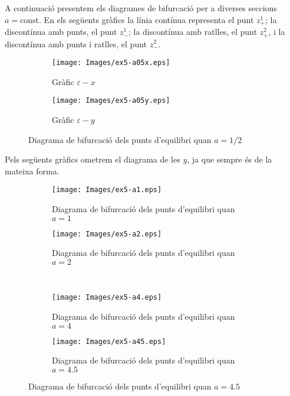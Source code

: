 \documentclass[a4paper]{article}
\theoremstyle{definition}
\begin{document}
A continuació presentem els diagrames de bifurcació per a diverses seccions $a=\mathrm{const}$. En els següents gràfics la línia contínua representa el punt $z_+^1$; la discontínua amb punts, el punt $z_-^1$; la discontínua amb ratlles, el punt $z_+^2$, i la discontínua amb punts i ratlles, el punt $z_-^2$.

\begin{figure}[!ht]
  \captionsetup[subfigure]{justification=centering}
  \centering
  \begin{subfigure}[b]{0.4\linewidth}
    \centering
    \texttt{[image: Images/ex5-a05x.eps]}
    \caption{Gràfic $\varepsilon - x$}
  \end{subfigure}
  \hfill
  \begin{subfigure}[b]{0.4\linewidth}
    \centering
    \texttt{[image: Images/ex5-a05y.eps]}
    \caption{Gràfic $\varepsilon - y$}
  \end{subfigure}
  \caption{Diagrama de bifurcació dels punts d'equilibri quan $a=1/2$}
\end{figure}
\newpage
Pels següents gràfics ometrem el diagrama de les $y$, ja que sempre és de la mateixa forma.

\begin{figure}[!ht]
  \captionsetup[subfigure]{justification=centering}
  \centering
  \begin{subfigure}[b]{0.49\linewidth}
    \centering
    \texttt{[image: Images/ex5-a1.eps]}
    \caption{Diagrama de bifurcació dels punts d'equilibri quan $a=1$}
  \end{subfigure}
  \hfill
  \begin{subfigure}[b]{0.49\linewidth}
    \centering
    \texttt{[image: Images/ex5-a2.eps]}
    \caption{Diagrama de bifurcació dels punts d'equilibri quan $a=2$}
    \label{fig2}
  \end{subfigure}
  \\
  \centering
  \begin{subfigure}[b]{0.49\linewidth}
    \centering
    \texttt{[image: Images/ex5-a4.eps]}
    \caption{Diagrama de bifurcació dels punts d'equilibri quan $a=4$}
  \end{subfigure}
  \hfill
  \begin{subfigure}[b]{0.49\linewidth}
    \centering
    \texttt{[image: Images/ex5-a45.eps]}
    \caption{Diagrama de bifurcació dels punts d'equilibri quan $a=4.5$}
  \end{subfigure}
\end{figure}
\end{document}
